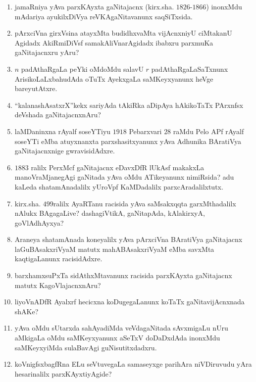 \begin{enumerate}
\item jamaRniya yAva parxKAyxta gaNitajacnx (kirx.sha. $1826$-$1866$) inonxMdu mAdariya ayukilxDiVya reVKAgaNitavanunx saqSiTxsida.
  
\item pArxciVna girxVsina atayxMta budidhxvaMta vijAcnxniyU ciMtakanU Agidadx AkiRmiDiVsf samakAliVnarAgidadx  ibabxru parxmuKa gaNitajacnxru yAru?
  
\item $n$ padAthaRgaLa peYki oMdoMdu salavU $r$ padAthaRgaLaSaTxnunx Arisi\-koLaLxbahudAda oTuTx AyekxgaLa saMKeyxyanunx heVge bareyutAtxre. 
  
\item ``kalanashAsatxrX''kekx sariyAda tAkiRka aDipAya hAkikoTaTx PArxnfsx deVshada gaNitajacnxnAru?

\item laMDaninxna rAyalf soseYTiyu $1918$ Pebarxvari $28$ raMdu Pelo APf rAyalf soseYTi eMba atuyxnanxta parxshasitxyanunx yAva Adhunika BAratiVya gaNitajacnxnige gwravisidAdxre.

\item $1883$ ralilx PerxMcf gaNitajacnx eDavxDfR lUkAsf makakxLa manoVraMjanegAgi gaNitada yAva oMdu ATikeyanunx nimiRsida? adu kaLeda shatamAnadalilx yUroVpf KaMDadalilx parxcAradalilxtutx.
  
\item kirx.sha. $499$ralilx AyaRTanu racisida yAva saMsakxqqta garxMthadalilx nAlukx BAgagaLive? dashagiVtikA, gaNitapAda, kAlakirxyA, goVlAdhAyxya?
  
\item Araneya shatamAnada koneyalilx yAva pArxciVna BAratiVya gaNitajacnx laGuBAsakxriVyaM matutx mahABAsakxriVyaM eMba savxMta kaqtigaLanunx racisidAdxre. 
  
\item barxhamxsuPxTa sidAthxMtavanunx racisida parxKAyxta gaNitajacnx matutx KagoVlajacnxnAru?
  
\item liyoVnADfR Ayalxrf hecicxna koDugegaLanunx koTaTx gaNitavijAcnxnada shAKe?
  
\item yAva oMdu sUtarxda sahAyadiMda veVdagaNitada sAvxmigaLu nUru aMkigaLa oMdu saMKeyxyanunx aSeTxV doDaDxdAda inonxMdu saMKeyxyiMda sulaBavAgi guNisutitxdadxru.
  
\item koVnigfsxbagfRna ELu seVtuvegaLa samaseyxge parihAra niVDiruvudu yAra hesarinalilx parxKAyxtiyAgide?


\end{enumerate}
